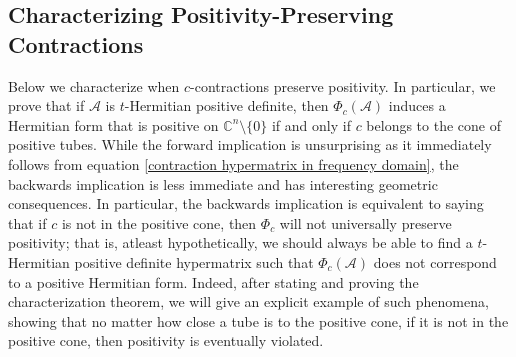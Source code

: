 \documentclass[11pt]{article}
\begin{document}
\subsection{Characterizing Positivity-Preserving Contractions}
Below we characterize when $c$-contractions preserve positivity. In particular, we prove that if $\mathcal{A}$ is $t$-Hermitian positive definite, then $\Phi_c(\mathcal{A})$ induces a Hermitian form that is positive on $\mathbb{C}^n\setminus \{0\}$ if and only if $c$ belongs to the cone of positive tubes. While the forward implication is unsurprising as it immediately follows from equation \eqref{contraction hypermatrix in frequency domain}, the backwards implication is less immediate and has interesting geometric consequences. In particular, the backwards implication is equivalent to saying that if $c$ is not in the positive cone, then $\Phi_c$ will not universally preserve positivity; that is, atleast hypothetically, we should always be able to find a $t$-Hermitian positive definite hypermatrix such that $\Phi_c(\mathcal{A})$ does not correspond to a positive Hermitian form. Indeed, after stating and proving the characterization theorem, we will give an explicit example of such phenomena, showing that no matter how close a tube is to the positive cone, if it is not in the positive cone, then positivity is eventually violated. 
\end{document}
